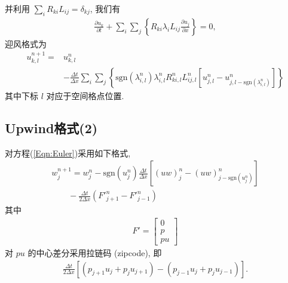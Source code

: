 \documentclass[10.5pt
]{article}
\begin{document}
并利用 $\sum_i R_{ki} L_{ij} = \delta_{kj}$, 我们有
\begin{align}
\frac{\partial u_k}{\partial t} + \sum_i \sum_j \left\{R_{ki} \lambda_i L_{ij} \frac{\partial
u_j}{\partial x}\right\} = 0,
\end{align}
迎风格式为
\begin{align}
u_{k,l}^{n+1} =& u_{k,l}^n \nonumber\\
& - \frac{\Delta t}{\Delta x} \sum_i \sum_j \left\{\text{sgn}(\lambda_{i,l}^n)
 \lambda_{i,l}^n R_{ki,l}^n L_{ij,l}^n \left[u_{j,l}^n - u_{j,l-\text{sgn}(\lambda_{i,l}^n)}^n\right]\right\}
\end{align}
其中下标 $l$ 对应于空间格点位置.

\subsection{Upwind格式(2)}
对方程(\ref{Eqn:Euler})采用如下格式,
\begin{align}
w_j^{n+1} = w_j^n - \text{sgn}(u_j^n) \frac{\Delta t}{\Delta x} \left[(u w)_j^n - (u
w)_{j-\text{sgn}(u_j^n)}^n\right] \nonumber
\\
\qquad - \frac{\Delta t}{2\Delta x} ({F'}_{j+1}^n - {F'}_{j-1}^n)
\end{align}
其中
\begin{align}
F' = \left[\begin{array}{c}
        0\\
        p\\
        p u
    \end{array}\right]
\end{align}
对 $pu$ 的中心差分采用拉链码 (zipcode), 即
\begin{align*}
\frac{\Delta t}{2\Delta x}\left[(p_{j+1} u_j+p_j u_{j+1}) -
(p_{j-1} u_j + p_j u_{j-1})\right].
\end{align*}
\end{document}
